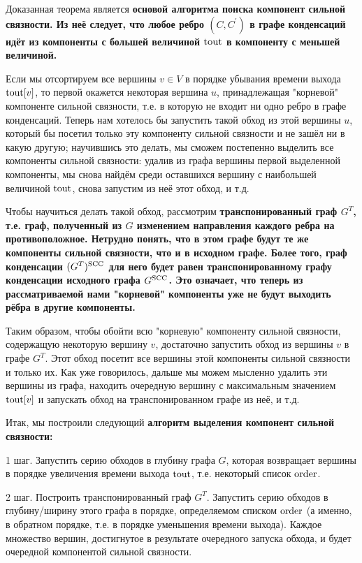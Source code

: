 Доказанная теорема является \bf{основой алгоритма} поиска компонент сильной связности. Из неё следует, что любое ребро $(C,C^\prime)$ в графе конденсаций идёт из компоненты с большей величиной ${\rm tout}$ в компоненту с меньшей величиной.

Если мы отсортируем все вершины $v \in V$ в порядке убывания времени выхода ${\rm tout}[v]$, то первой окажется некоторая вершина $u$, принадлежащая "корневой" компоненте сильной связности, т.е. в которую не входит ни одно ребро в графе конденсаций. Теперь нам хотелось бы запустить такой обход из этой вершины $u$, который бы посетил только эту компоненту сильной связности и не зашёл ни в какую другую; научившись это делать, мы сможем постепенно выделить все компоненты сильной связности: удалив из графа вершины первой выделенной компоненты, мы снова найдём среди оставшихся вершину с наибольшей величиной ${\rm tout}$, снова запустим из неё этот обход, и т.д.

Чтобы научиться делать такой обход, рассмотрим \bf{транспонированный граф} $G^T$, т.е. граф, полученный из $G$ изменением направления каждого ребра на противоположное. Нетрудно понять, что в этом графе будут те же компоненты сильной связности, что и в исходном графе. Более того, граф конденсации $(G^T)^{\rm SCC}$ для него будет равен транспонированному графу конденсации исходного графа $G^{\rm SCC}$. Это означает, что теперь из рассматриваемой нами "корневой" компоненты уже не будут выходить рёбра в другие компоненты.

Таким образом, чтобы обойти всю "корневую" компоненту сильной связности, содержащую некоторую вершину $v$, достаточно запустить обход из вершины $v$ в графе $G^T$. Этот обход посетит все вершины этой компоненты сильной связности и только их. Как уже говорилось, дальше мы можем мысленно удалить эти вершины из графа, находить очередную вершину с максимальным значением ${\rm tout}[v]$ и запускать обход на транспонированном графе из неё, и т.д.

Итак, мы построили следующий \bf{алгоритм} выделения компонент сильной связности:

1 шаг. Запустить серию обходов в глубину графа $G$, которая возвращает вершины в порядке увеличения времени выхода ${\rm tout}$, т.е. некоторый список $\rm order$.

2 шаг. Построить транспонированный граф $G^T$. Запустить серию обходов в глубину/ширину этого графа в порядке, определяемом списком $\rm order$ (а именно, в обратном порядке, т.е. в порядке уменьшения времени выхода). Каждое множество вершин, достигнутое в результате очередного запуска обхода, и будет очередной компонентой сильной связности.

